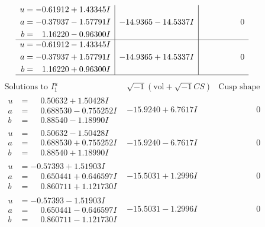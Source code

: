 \documentclass[1p]{elsarticle_modified}
\theoremstyle{definition}
\newcommand{\I}{\sqrt{-1}}
\begin{document}
$$\begin{array}{c|c|c}
\begin{aligned}
u &= -0.61912 + 1.43345 I \\
a &= -0.37937 - 1.57791 I \\
b &= \phantom{-}1.16220 - 0.96300 I\end{aligned}
 & -14.9365 - 14.5337 I & \phantom{-0.000000 } 0 \\ \hline\begin{aligned}
u &= -0.61912 - 1.43345 I \\
a &= -0.37937 + 1.57791 I \\
b &= \phantom{-}1.16220 + 0.96300 I\end{aligned}
 & -14.9365 + 14.5337 I & \phantom{-0.000000 } 0\\
 \hline 
 \end{array}$$\newpage$$\begin{array}{c|c|c}  
\text{Solutions to }I^u_{1}& \I (\text{vol} + \sqrt{-1}CS) & \text{Cusp shape}\\
 \hline 
\begin{aligned}
u &= \phantom{-}0.50632 + 1.50428 I \\
a &= \phantom{-}0.688530 - 0.755252 I \\
b &= \phantom{-}0.88540 - 1.18990 I\end{aligned}
 & -15.9240 + 6.7617 I & \phantom{-0.000000 } 0 \\ \hline\begin{aligned}
u &= \phantom{-}0.50632 - 1.50428 I \\
a &= \phantom{-}0.688530 + 0.755252 I \\
b &= \phantom{-}0.88540 + 1.18990 I\end{aligned}
 & -15.9240 - 6.7617 I & \phantom{-0.000000 } 0 \\ \hline\begin{aligned}
u &= -0.57393 + 1.51903 I \\
a &= \phantom{-}0.650441 + 0.646597 I \\
b &= \phantom{-}0.860711 + 1.121730 I\end{aligned}
 & -15.5031 + 1.2996 I & \phantom{-0.000000 } 0 \\ \hline\begin{aligned}
u &= -0.57393 - 1.51903 I \\
a &= \phantom{-}0.650441 - 0.646597 I \\
b &= \phantom{-}0.860711 - 1.121730 I\end{aligned}
 & -15.5031 - 1.2996 I & \phantom{-0.000000 } 0 \\ \hline\begin{aligned}

\end{aligned}
\end{array}$$
\end{document}
